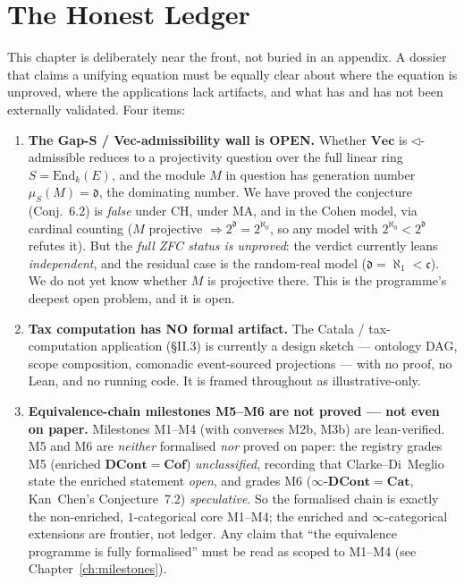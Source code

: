 \documentclass[11pt]{report}
\theoremstyle{plain}
\theoremstyle{definition}
\theoremstyle{remark}
\newcommand{\DCont}{\mathbf{DCont}}
\newcommand{\Cat}{\mathbf{Cat}}
\newcommand{\VecC}{\mathbf{Vec}}
\newcommand{\dd}{\mathfrak{d}}
\newcommand{\cont}{\mathfrak{c}}
\begin{document}
\chapter{The Honest Ledger}

This chapter is deliberately near the front, not buried in an appendix. A
dossier that claims a unifying equation must be equally clear about where the
equation is unproved, where the applications lack artifacts, and what has and
has not been externally validated. Four items:

\begin{enumerate}
\item \textbf{The Gap-S / Vec-admissibility wall is OPEN.}
Whether $\VecC$ is $\lhd$-admissible reduces to a projectivity question over the
full linear ring $S=\mathrm{End}_k(E)$, and the module $M$ in question has
generation number $\mu_S(M)=\dd$, the dominating number. We have proved the
conjecture (Conj.~6.2) is \emph{false} under $\mathrm{CH}$, under $\mathrm{MA}$,
and in the Cohen model, via cardinal counting ($M$ projective
$\Rightarrow 2^{\dd}=2^{\aleph_0}$, so any model with
$2^{\aleph_0}<2^{\dd}$ refutes it). But the \emph{full ZFC status is unproved}:
the verdict currently leans \emph{independent}, and the residual case is the
random-real model ($\dd=\aleph_1<\cont$). We do not yet know whether $M$ is
projective there. This is the programme's deepest open problem, and it is open.

\item \textbf{Tax computation has NO formal artifact.}
The Catala / tax-computation application (\S II.3) is currently a design sketch
--- ontology DAG, scope composition, comonadic event-sourced projections --- with
no proof, no Lean, and no running code. It is framed throughout as
illustrative-only.

\item \textbf{Equivalence-chain milestones M5--M6 are not proved --- not even on paper.}
Milestones M1--M4 (with converses M2b, M3b) are lean-verified. M5 and M6 are
\emph{neither} formalised \emph{nor} proved on paper: the registry grades M5
(enriched $\DCont=\mathbf{Cof}$) \emph{unclassified}, recording that
Clarke--Di~Meglio state the enriched statement \emph{open}, and grades M6
($\infty$-$\DCont=\Cat$, Kan~Chen's Conjecture~7.2) \emph{speculative}. So the
formalised chain is exactly the non-enriched, $1$-categorical core M1--M4; the
enriched and $\infty$-categorical extensions are frontier, not ledger. Any claim
that ``the equivalence programme is fully formalised'' must be read as scoped to
M1--M4 (see Chapter~\ref{ch:milestones}).


\end{enumerate}
\end{document}
